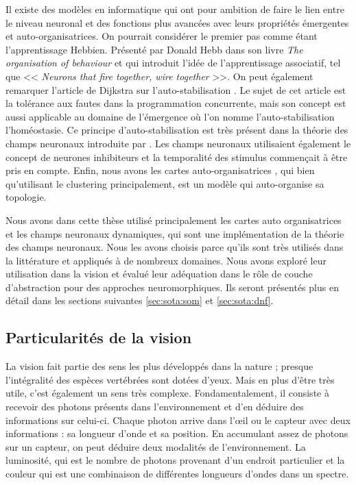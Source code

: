 	Il existe des modèles en informatique qui ont pour ambition de faire le lien entre le niveau neuronal et des fonctions plus avancées avec leurs propriétés émergentes et auto-organisatrices. On pourrait considérer le premier pas comme étant l'apprentissage Hebbien. Présenté par Donald Hebb dans son livre \textit{The organisation of behaviour} \cite{hebb1949organisation} et qui introduit l'idée de l'apprentissage associatif, tel que << \textit{Neurons that fire together, wire together} >>. On peut également remarquer l'article de Dijkstra sur l'auto-stabilisation \cite{dijkstra1982self}. Le sujet de cet article est la tolérance aux fautes dans la programmation concurrente, mais son concept est aussi applicable au domaine de l'émergence où l'on nomme l'auto-stabilisation l'homéostasie. Ce principe d'auto-stabilisation est très présent dans la théorie des champs neuronaux introduite par \cite{amari1977dynamics}. Les champs neuronaux utilisaient également le concept de neurones inhibiteurs et la temporalité des stimulus commençait à être pris en compte. Enfin, nous avons les cartes auto-organisatrices \cite{kohonen-som82}, qui bien qu'utilisant le clustering principalement, est un modèle qui auto-organise sa topologie.

	Nous avons dans cette thèse utilisé principalement les cartes auto organisatrices et les champs neuronaux dynamiques, qui sont une implémentation de la théorie des champs neuronaux. Nous les avons choisis parce qu'ils sont très utilisés dans la littérature et appliqués à de nombreux domaines. Nous avons exploré leur utilisation dans la vision et évalué leur adéquation dans le rôle de couche d'abstraction pour des approches neuromorphiques. Ils seront présentés plus en détail dans les sections suivantes \ref{sec:sota:som} et \ref{sec:sota:dnf}.

\subsection{Particularités de la vision}\label{sec:sota:vision}

	La vision fait partie des sens les plus développés dans la nature ; presque l'intégralité des espèces vertébrées sont dotées d'yeux. Mais en plus d'être très utile, c'est également un sens très complexe. Fondamentalement, il consiste à recevoir des photons présents dans l'environnement et d'en déduire des informations sur celui-ci. Chaque photon arrive dans l'œil ou le capteur avec deux informations : sa longueur d'onde et sa position. En accumulant assez de photons sur un capteur, on peut déduire deux modalités de l'environnement. La luminosité, qui est le nombre de photons provenant d'un endroit particulier et la couleur qui est une combinaison de différentes longueurs d'ondes dans un spectre.

